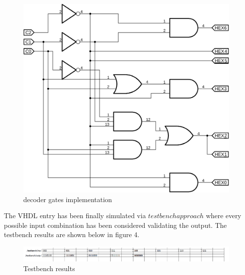 \documentclass[12pt]{article}
\begin{document}
	 
	 
	  \begin{figure}[!h]
	  \centering
	  \includegraphics[scale = 0.65]{Niki_puntoA/schema.png}
	  \caption{decoder gates implementation}
  	\end{figure}		
  
  The VHDL entry has been finally simulated via  $testbench approach$ where every possible input combination has been considered validating the output.
  The testbench results are shown below in figure 4.
  
  \begin{figure}[!h]
  	\centering
  	\includegraphics[scale = 0.65]{Niki_puntoA/Capturef.png}
  	\caption{Testbench results}
  \end{figure}
\end{document}
